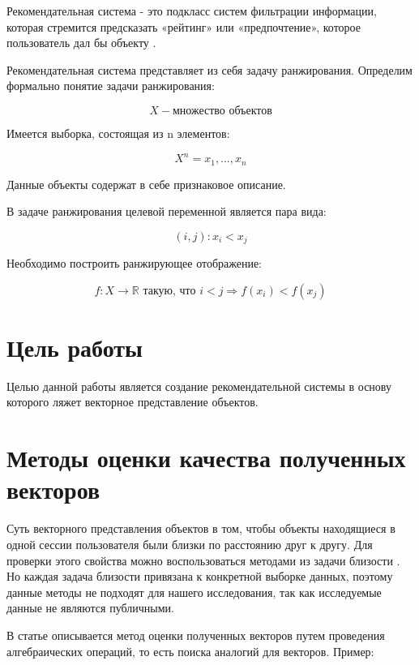 \begin{definition}
	Рекомендательная система - это подкласс систем фильтрации информации, которая стремится предсказать «рейтинг» или «предпочтение», которое пользователь дал бы объекту \cite{ricci2011introduction}.
\end{definition}

Рекомендательная система представляет из себя задачу ранжирования.
Определим формально понятие задачи ранжирования:

\[ X - \text{множество объектов} \]

Имеется выборка, состоящая из n элементов:


\begin{equation}
	X^{n} = {x_1,\dots, x_n}
\end{equation}


Данные объекты содержат в себе признаковое описание.

В задаче ранжирования целевой переменной является пара вида:

\begin{equation}
	(i, j): x_i < x_j
\end{equation}

Необходимо построить ранжирующее отображение:

\begin{equation}
	f: X \rightarrow \mathbb{R} \text{ такую, что } i < j \Rightarrow f(x_i) < f(x_j)
\end{equation}

\section{Цель работы}
Целью данной работы является создание рекомендательной системы в основу которого ляжет векторное представление объектов.


\section{Методы оценки качества полученных векторов}
Суть векторного представления объектов в том, чтобы объекты находящиеся в одной сессии пользователя были близки по расстоянию друг к другу.
Для проверки этого свойства можно воспользоваться методами из задачи близости \cite{rubenstein1965contextual}. Но каждая задача близости привязана к конкретной выборке данных, поэтому данные методы не подходят для нашего исследования, так как исследуемые данные не являются публичными.


В статье \cite{mikolov2013efficient} описывается метод оценки полученных векторов путем проведения алгебраических операций, то есть поиска аналогий для векторов.
Пример:

